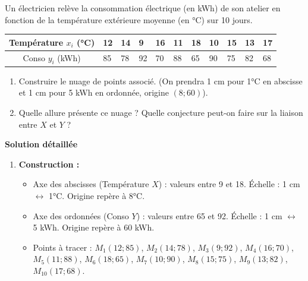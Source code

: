\documentclass[11pt]{article}
\begin{document}
\begin{exoresolu}
Un électricien relève la consommation électrique (en kWh) de son atelier en fonction de la température extérieure moyenne (en °C) sur 10 jours.
\begin{center}
\begin{tabularx}{\linewidth}{|c|*{10}{X|}}\hline
Température $x_i$ (°C) & 12 & 14 & 9 & 16 & 11 & 18 & 10 & 15 & 13 & 17 \\ \hline
Conso $y_i$ (kWh) & 85 & 78 & 92 & 70 & 88 & 65 & 90 & 75 & 82 & 68 \\ \hline
\end{tabularx}
\end{center}
\begin{enumerate}
    \item Construire le nuage de points associé. (On prendra 1 cm pour 1°C en abscisse et 1 cm pour 5 kWh en ordonnée, origine $(8; 60)$).
    \item Quelle allure présente ce nuage ? Quelle conjecture peut-on faire sur la liaison entre $X$ et $Y$ ?
\end{enumerate}
\tcblower
\textbf{Solution détaillée}
\begin{enumerate}
    \item \textbf{Construction :}
    \begin{itemize}
        \item Axe des abscisses (Température $X$) : valeurs entre 9 et 18. Échelle : 1 cm $\leftrightarrow$ 1°C. Origine repère à 8°C.
        \item Axe des ordonnées (Conso $Y$) : valeurs entre 65 et 92. Échelle : 1 cm $\leftrightarrow$ 5 kWh. Origine repère à 60 kWh.
        \item Points à tracer : $M_1(12;85)$, $M_2(14;78)$, $M_3(9;92)$, $M_4(16;70)$, $M_5(11;88)$, $M_6(18;65)$, $M_7(10;90)$, $M_8(15;75)$, $M_9(13;82)$, $M_{10}(17;68)$.
    \end{itemize}
    \begin{popfigure}
\end{popfigure}
\end{enumerate}
\end{exoresolu}
\end{document}
